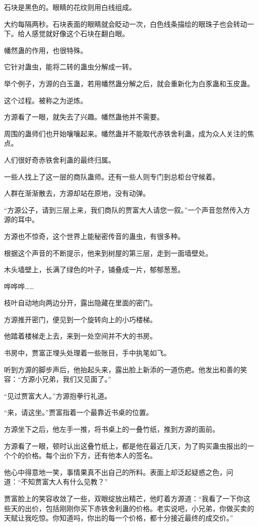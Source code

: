 \begin{this_body}
石块是黑色的。眼睛的花纹则用白线组成。

大约每隔两秒。石块表面的眼睛就会眨动一次，白色线条描绘的眼珠子也会转动一下。给人感觉就好像这个石块在翻白眼。

幡然蛊的作用，也很特殊。

它针对蛊虫，能将二转的蛊虫分解成一转。

举个例子，方源的白玉蛊，若用幡然蛊分解之后，就会重新化为白豕蛊和玉皮蛊。

这个过程。被称之为逆炼。

方源看了一眼，就失去了兴趣。幡然蛊他并不需要。

周围的蛊师们也开始嚷嚷起来。幡然蛊并不能取代赤铁舍利蛊，成为众人关注的焦点。

人们很好奇赤铁舍利蛊的最终归属。

一些人找上了这一层的商队蛊师。还有一些人则专门到总柜台守候着。

人群在渐渐散去，方源却站在原地，没有动弹。

“方源公子，请到三层上来，我们商队的贾富大人请您一叙。”一个声音忽然传入方源的耳中。

方源也不惊奇，这个世界上能秘密传音的蛊虫，有很多种。

根据这个声音的不断提示，他来到树屋的第三层，走到一面墙壁处。

木头墙壁上，长满了绿色的叶子，铺叠成一片，郁郁葱葱。

哗哗哗……

枝叶自动地向两边分开，露出隐藏在里面的密门。

方源推开密门，便见到一个旋转向上的小巧楼梯。

他踏着楼梯走上去，来到一处空间并不大的书房。

书房中，贾富正埋头处理着一些账目，手中执笔如飞。

听到方源的脚步声后，他抬起头来，露出脸上新添的一道伤疤。他发出和善的笑容：“方源小兄弟，我们又见面了。”

“见过贾富大人。”方源抱拳行礼道。

“来，请这坐。”贾富指着一个最靠近书桌的位置。

方源坐下之后，他左手一推，将书桌上的一叠竹纸，推到方源的面前。

方源看了一眼，顿时认出这叠竹纸上，都是他在最近几天，为了购买蛊虫报出的一个个的价格。每个出价下方，还有他本人的签名。

他心中得意地一笑，事情果真不出自己的所料。表面上却泛起疑惑之色，问道：“不知贾富大人有什么见教？”

贾富脸上的笑容收敛了一些，双眼绽放出精芒，他盯着方源道：“我看了一下你这些天的出价，包括刚刚你买下赤铁舍利蛊的价格。老实说吧，小兄弟，你做买卖的天赋让我吃惊。你知道吗，你出的每一个价格，都十分接近最终的成交价。”


\end{this_body}
